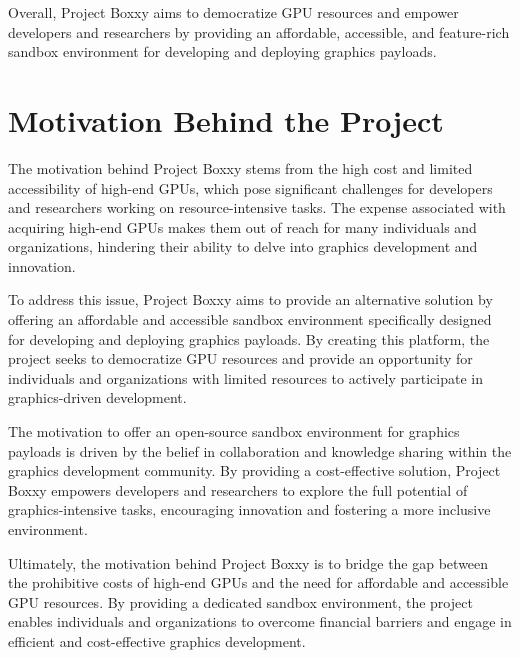 Overall, Project Boxxy aims to democratize GPU resources and empower developers and researchers by providing an affordable, accessible, and feature-rich sandbox environment for developing and deploying graphics payloads.

\section{Motivation Behind the Project}

The motivation behind Project Boxxy stems from the high cost and limited accessibility of high-end GPUs, which pose significant challenges for developers and researchers working on resource-intensive tasks. The expense associated with acquiring high-end GPUs makes them out of reach for many individuals and organizations, hindering their ability to delve into graphics development and innovation.

To address this issue, Project Boxxy aims to provide an alternative solution by offering an affordable and accessible sandbox environment specifically designed for developing and deploying graphics payloads.
By creating this platform, the project seeks to democratize GPU resources and provide an opportunity for individuals and organizations with limited resources to actively participate in graphics-driven development.

The motivation to offer an open-source sandbox environment for graphics payloads is driven by the belief in collaboration and knowledge sharing within the graphics development community.
By providing a cost-effective solution, Project Boxxy empowers developers and researchers to explore the full potential of graphics-intensive tasks, encouraging innovation and fostering a more inclusive environment.

Ultimately, the motivation behind Project Boxxy is to bridge the gap between the prohibitive costs of high-end GPUs and the need for affordable and accessible GPU resources.
By providing a dedicated sandbox environment, the project enables individuals and organizations to overcome financial barriers and engage in efficient and cost-effective graphics development.